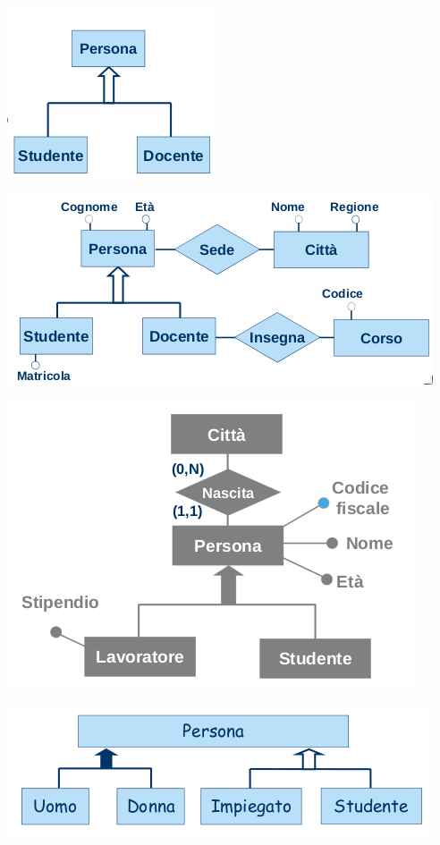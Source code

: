 \documentclass[a4paper,12pt, oneside]{book}
\begin{document}
\begin{center}
\includegraphics[scale=2.5]{img/isa3.png}
\end{center}
\begin{center}
\includegraphics[scale=0.5]{img/isa4.png}
\end{center}
\begin{center}
\includegraphics[scale=0.8]{img/isa5.png}
\end{center}
\begin{center}
\includegraphics[scale=0.8]{img/isa6.png}
\end{center}
\end{document}

